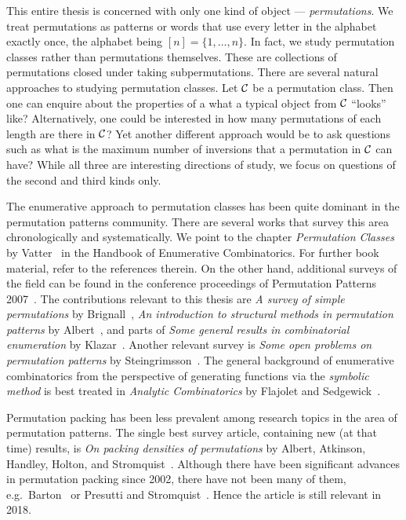 \documentclass[12pt, a4paper, twoside]{report}
\begin{document}
This entire thesis is concerned with only one kind of object --- \emph{permutations}. We treat permutations as patterns or words that use every letter in the alphabet exactly once, the alphabet being $[n] = \{1,\ldots,n\}$. In fact, we study permutation classes rather than permutations themselves. These are collections of permutations closed under taking subpermutations. There are several natural approaches to studying permutation classes. Let $\mathcal{C}$ be a permutation class. Then one can enquire about the properties of a what a typical object from $\mathcal{C}$ ``looks'' like? Alternatively, one could be interested in how many permutations of each length are there in $\mathcal{C}$? Yet another different approach would be to ask questions such as what is the maximum number of inversions that a permutation in $\mathcal{C}$ can have? While all three are interesting directions of study, we focus on questions of the second and third kinds only.

The enumerative approach to permutation classes has been quite dominant in the permutation patterns community. There are several works that survey this area chronologically and systematically. We point to the chapter \emph{Permutation Classes} by Vatter~\cite{vatterhandbook} in the Handbook of Enumerative Combinatorics. For further book material, refer to the references therein. On the other hand, additional surveys of the field can be found in the conference proceedings of Permutation Patterns 2007~\cite{lintonruskucvatter}. The contributions relevant to this thesis are \emph{A survey of simple permutations} by Brignall~\cite{brignallsimple}, \emph{An introduction to structural methods in permutation patterns} by Albert~\cite{albertstructural}, and parts of \emph{Some general results in combinatorial enumeration} by Klazar~\cite{klazargeneral}. Another relevant survey is \emph{Some open problems on permutation patterns} by Steingrimsson~\cite{einar2012openproblems}. The general background of enumerative combinatorics from the perspective of generating functions via the \emph{symbolic method} is best treated in \emph{Analytic Combinatorics} by Flajolet and Sedgewick~\cite{analcomb}.

Permutation packing has been less prevalent among research topics in the area of permutation patterns. The single best survey article, containing new (at that time) results, is \emph{On packing densities of permutations} by Albert, Atkinson, Handley, Holton, and Stromquist~\cite{albert2002packing}. Although there have been significant advances in permutation packing since 2002, there have not been many of them, e.g.~Barton~\cite{barton2004packing} or Presutti and Stromquist~\cite{presutti2010packing}. Hence the article is still relevant in 2018.
\end{document}
